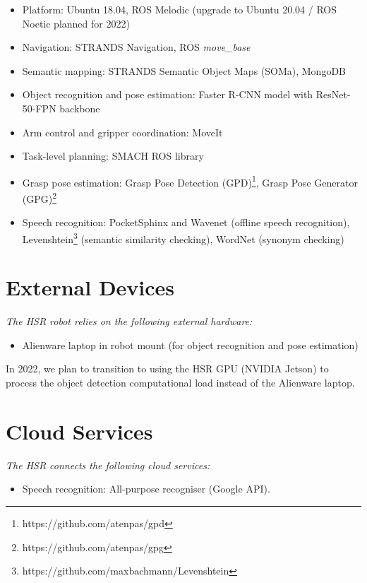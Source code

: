 \begin{itemize}
	\item Platform: Ubuntu 18.04, ROS Melodic (upgrade to Ubuntu 20.04 / ROS Noetic planned for 2022) 
	\item Navigation: STRANDS Navigation, ROS  \textit{move\_base}
	\item Semantic mapping: STRANDS Semantic Object Maps (SOMa), MongoDB
	\item Object recognition and pose estimation: Faster R-CNN model with ResNet-50-FPN backbone
	\item Arm control and gripper coordination: MoveIt
	\item Task-level planning: SMACH ROS library
	\item Grasp pose estimation: Grasp Pose Detection  (GPD)\footnote{https://github.com/atenpas/gpd}, Grasp Pose Generator (GPG)\footnote{https://github.com/atenpas/gpg}
	\item Speech recognition: PocketSphinx and Wavenet (offline speech recognition), Levenshtein\footnote{https://github.com/maxbachmann/Levenshtein} (semantic similarity checking), WordNet (synonym checking) 
\end{itemize}

\section*{External Devices}

\textit{The HSR robot relies on the following external hardware:}

\begin{itemize}
	\item Alienware laptop in robot mount (for object recognition and pose estimation)
\end{itemize}

In 2022, we plan to transition to using the HSR GPU (NVIDIA Jetson) to process the object detection computational load instead of the Alienware laptop.

\section*{Cloud Services}

\textit{The HSR connects the following cloud services:}
\begin{itemize}
	\item Speech recognition: All-purpose recogniser (Google API).
\end{itemize}
